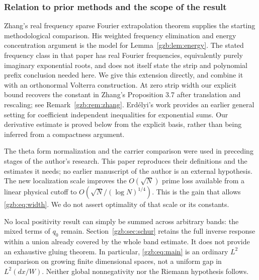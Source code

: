 \documentclass[11pt,a4paper]{article}
\numberwithin{equation}{section}
\theoremstyle{definition}\newtheorem{definition}[theorem]{Definition}
\theoremstyle{remark}\newtheorem{remark}[theorem]{Remark}
\begin{document}
\subsubsection{Relation to prior methods and the scope of the result}
Zhang's real frequency sparse Fourier extrapolation theorem
\cite[Theorem 1.1 and Proposition 3.7]{Zhang} supplies the starting
methodological comparison. His weighted frequency elimination and energy
concentration argument is the model for Lemma~\ref{gzb:lem:energy}.
The stated frequency class in that paper has real Fourier frequencies,
equivalently purely imaginary exponential roots, and does not itself
state the strip and polynomial prefix conclusion needed here.
We give this extension directly, and combine it with an orthonormal
Volterra construction. At zero strip width our explicit bound recovers
the constant in Zhang's Proposition 3.7 after translation and rescaling;
see Remark~\ref{gzb:rem:zhang}.
Erd\'elyi's work \cite{Erdelyi} provides an earlier general setting for
coefficient independent inequalities for exponential sums. Our derivative
estimate is proved below from the explicit basis, rather than being
inferred from a compactness argument.

The theta form normalization and the carrier comparison were used in
preceding stages of the author's research. This paper reproduces their
definitions and the estimates it needs; no earlier manuscript of the
author is an external hypothesis. The new localization scale improves
the $O(\sqrt N)$ prime loss available from a linear physical cutoff to
$O(\sqrt N/(\log N)^{1/4})$. This is the gain that allows
\eqref{gzb:eq:width}. We do not assert optimality of that scale or its constants.

No local positivity result can simply be summed across arbitrary bands:
the mixed terms of $q_0$ remain. Section~\ref{gzb:sec:schur} retains the full
inverse response within a union already covered by the whole band
estimate. It does not provide an exhaustive gluing theorem.
In particular, \eqref{gzb:eq:main} is an ordinary $L^2$ comparison on growing
finite dimensional spaces, not a uniform gap in $L^2(dx/W)$.
Neither global nonnegativity nor the Riemann hypothesis follows.
\end{document}
